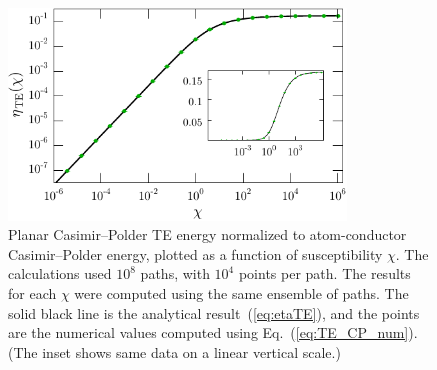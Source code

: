 \begin{figure}
  \centering
 \includegraphics[width=0.8\textwidth]{fig/temp/eff_TE_atom_wall}
  \caption[Planar Casimir--Polder TE energy as function of $\chi$]
  {Planar Casimir--Polder TE energy normalized to atom-conductor Casimir--Polder energy, plotted as a function of susceptibility $\chi$.  
    The calculations used $10^8$ paths, with $10^4$ points per path.
    The results for each $\chi$ were computed using the same ensemble of paths.
    The solid black line is the analytical result~(\ref{eq:etaTE}), and the points are the numerical
    values computed using Eq.~(\ref{eq:TE_CP_num}).  
    (The inset shows same data on a linear vertical scale.)
    }
  \label{fig:eff_TE_atom_wall}
\end{figure}



